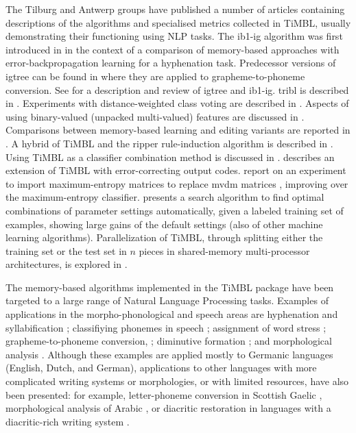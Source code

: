 \documentclass{report}
\begin{document}
The Tilburg and Antwerp groups have published a number of articles containing descriptions of the algorithms and specialised metrics collected in TiMBL, usually demonstrating their functioning using NLP tasks. The {\sc ib1-ig} algorithm was first introduced in \cite{Daelemans+92b} in the context of a comparison of memory-based approaches with error-back\-propagation learning for a hyphenation task.  Predecessor versions of {\sc igtree} can be found in \cite{Daelemans+93c,VandenBosch+93} where they are applied to grapheme-to-phoneme conversion.  See \cite{Daelemans+97} for a description and review of {\sc igtree} and {\sc ib1-ig}. {\sc tribl} is described in \cite{Daelemans+97d}.  Experiments with distance-weighted class voting are described in \cite{Zavrel97}. Aspects of using binary-valued (unpacked multi-valued) features are discussed in \cite{VandenBosch+00}.  Comparisons between memory-based learning and editing variants are reported in \cite{VandenBosch99,Daelemans+99}. A hybrid of TiMBL and the {\sc ripper} rule-induction algorithm \cite{Cohen95} is described in \cite{VandenBosch00,VandenBosch04}. Using TiMBL as a classifier combination method is discussed in \cite{Halteren+01}.  describes an extension of TiMBL with error-correcting output codes.  report on an experiment to import maximum-entropy matrices to replace {\sc mvdm} matrices \cite{Hendrickx+04}, improving over the maximum-entropy classifier.  presents a search algorithm to find optimal combinations of parameter settings automatically, given a labeled training set of examples, showing large gains of the default settings (also of other machine learning algorithms). Parallelization of TiMBL, through splitting either the training set or the test set in $n$ pieces in shared-memory multi-processor architectures, is explored in \cite{VandenBosch+07b}.

The memory-based algorithms implemented in the TiMBL package have been targeted to a large range of Natural Language Processing tasks. Examples of applications in the morpho-phonological and speech areas are hyphenation and syllabification \cite{Daelemans+92b}; classifiying phonemes in speech \cite{Kocsor+00}; assignment of word stress \cite{Daelemans+94}; grapheme-to-phoneme conversion, \cite{VandenBosch+93,Daelemans+96,Canisius+06}; diminutive formation \cite{Daelemans+98a}; and morphological analysis \cite{VandenBosch+96,VandenBosch+99,Canisius+06}. Although these examples are applied mostly to Germanic languages (English, Dutch, and German), applications to other languages with more complicated writing systems or morphologies, or with limited resources, have also been presented: for example, letter-phoneme conversion in Scottish Gaelic \cite{Wolters+97}, morphological analysis of Arabic \cite{Marsi+05}, or diacritic restoration in languages with a diacritic-rich writing system \cite{Mihalcea02,DePauw+07}.
\end{document}
